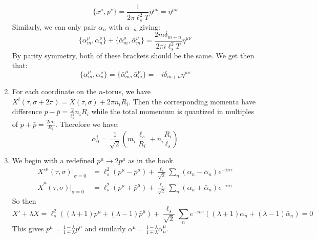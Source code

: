 \documentclass[11pt, class=article, crop=false]{standalone}
\begin{document}
\begin{enumerate}
\begin{equation}
			\{x^\mu, p^\nu\} = \frac{1}{2 \pi \ell_s^2 T}  \eta^{\mu \nu} = \eta^{\mu \nu}
		\end{equation}
		Similarly, we can only pair $\alpha_n$ with $\alpha_{-n}$ giving:
		\begin{equation}
			\{\alpha_m^\mu, \alpha_n^\nu\} + \{\bar \alpha_{m}^\mu, \bar \alpha_m^\nu\} = \frac{2 m \delta_{m+n}}{2 \pi i \ell_s^2 T} \eta^{\mu \nu}
		\end{equation}
		By parity symmetry, both of these brackets should be the same. We get then that:
		\begin{equation}
			\{\alpha_m^\mu, \alpha_n^\nu\}= \{\bar \alpha_{m}^\mu, \bar \alpha_m^\nu\}= -i \delta_{m+n} \eta^{\mu \nu}
		\end{equation}
		
		\item For each coordinate on the $n$-torus, we have $X^i(\tau, \sigma+2\pi) = X(\tau, \sigma) + 2 \pi n_i R_i$. Then the corresponding momenta have difference $p - \bar p = \frac{2}{\ell_s^2} n_i R_i$ while the total momentum is quantized in multiples of $p+\bar p = \frac{2 m_i}{R_i}$. Therefore we have:
		\begin{equation}
			\alpha^i_0 = \frac{1}{\sqrt 2} \left(m_i \frac{\ell_s}{R_i} + n_i \frac{R_i}{\ell_s}\right)
		\end{equation}
		
		\item
		We begin with a redefined $p^\mu \to 2 p^\mu$ as in the book.
		\begin{equation}
			\begin{aligned}
				{X'}^\mu(\tau, \sigma)|_{\sigma = 0} &= \ell_s^2 (p^\mu - \bar p^\mu) + \frac{\ell_s}{\sqrt 2} \sum_{n} (\alpha_n - \bar \alpha_{n}) e^{- i n \tau}
				\\{\dot X}^\mu(\tau, \sigma)|_{\sigma = 0} &=  \ell_s^2 (p^\mu + \bar p^\mu) + \frac{\ell_s}{\sqrt 2} \sum_{n} (\alpha_n + \bar \alpha_n)e^{-in\tau}
			\end{aligned}
		\end{equation}
		So then
		\[
			X' + \lambda \dot X = \ell_s^2 \left((\lambda + 1) p^\mu + (\lambda - 1) \bar p^\mu\right) + \frac{\ell_s}{\sqrt 2} \sum_{n} e^{-in\tau} \left((\lambda + 1) \alpha_n + (\lambda-1) \bar \alpha_n\right) = 0
		\]
		This gives $p^\mu = \frac{1-\lambda}{1+\lambda} \bar p^\mu$ and similarly $\alpha^\mu = \frac{1-\lambda}{1+\lambda} \bar \alpha_n^\mu$. 
		

\end{enumerate}
\end{document}
